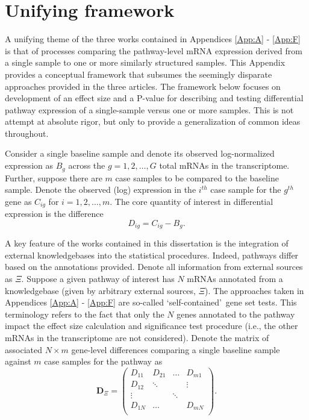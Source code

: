 \chapter{Unifying framework} \label{App:eqns}

\indent \indent A unifying theme of the three works contained in Appendices \ref{App:A} - \ref{App:F} is that of processes comparing the pathway-level mRNA expression derived from a single sample to one or more similarly structured samples. This Appendix provides a conceptual framework that subsumes the seemingly disparate approaches provided in the three articles. The framework below focuses on  development of an effect size and a P-value for describing and testing differential pathway expression of a single-sample versus one or more samples. This is not attempt at absolute rigor, but only to provide a generalization of common ideas throughout.

Consider a single baseline sample and denote its observed log-normalized expression as $B_{g}$ across the $g=1,2,\ldots,G$ total mRNAs in the transcriptome. Further, suppose there are $m$ case samples to be compared to the baseline sample. Denote the observed (log) expression in the $i^{th}$ case sample for the $g^{th}$ gene as $C_{ig}$ for $i=1,2,\ldots,m$. The core quantity of interest in differential expression is the difference
\begin{equation*}
\label{eq:diff}
D_{ig}=C_{ig}-B_{g}.
\end{equation*}

A key feature of the works contained in this dissertation is the integration of external knowledgebases into the statistical procedures. Indeed, pathways differ based on the annotations provided. Denote all information from external sources as $\Xi$. Suppose a given pathway of interest has $N$ mRNAs annotated from a knowledgebase (given by arbitrary external sources, $\Xi$). The approaches taken in Appendices \ref{App:A} - \ref{App:F} are so-called \lq self-contained\rq~gene set tests. This terminology refers to the fact that only the $N$ genes annotated to the pathway impact the effect size calculation and significance test procedure (i.e., the other mRNAs in the transcriptome are not considered). Denote the matrix of associated $N \times m$ gene-level differences comparing a single baseline sample against $m$ case samples for the pathway as
\begin{equation*}
  \label{eq:Dmat}
  \mathbf{D}_{\Xi} = \left ( \begin{array}{rcccc}
    D_{11} & D_{21} & \ldots & D_{m1} \\
    D_{12} & \ddots &  & \vdots \\
    \vdots &  & \ddots &  \\
    D_{1N} & \ldots &  & D_{mN} \\
\end{array} \right ) \tag{1}.
\end{equation*}

